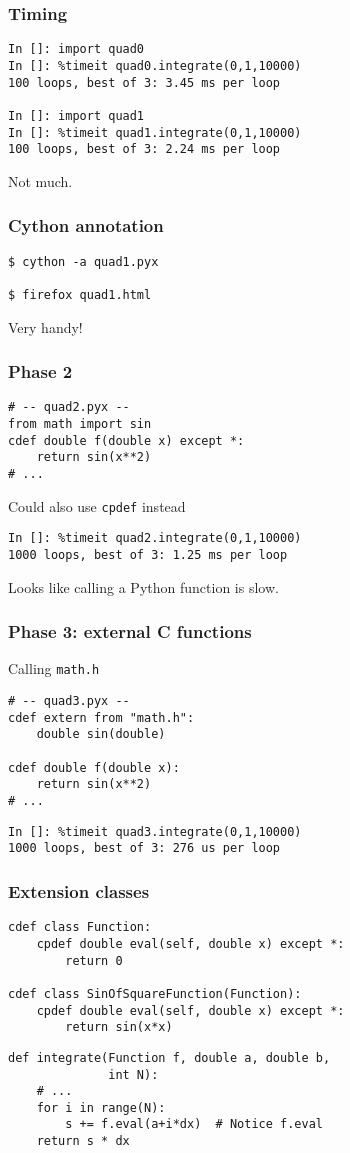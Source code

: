 \documentclass[14pt,compress]{beamer}
\newcounter{time}
\newcommand{\typ}[1]{\lstinline{#1}}
\begin{document}
\begin{frame}[fragile]
    \frametitle{Timing}
\begin{lstlisting}
In []: import quad0
In []: %timeit quad0.integrate(0,1,10000)
100 loops, best of 3: 3.45 ms per loop

In []: import quad1
In []: %timeit quad1.integrate(0,1,10000)
100 loops, best of 3: 2.24 ms per loop
\end{lstlisting}
Not much.
\end{frame}

\begin{frame}[fragile]
    \frametitle{Cython annotation}
\begin{lstlisting}
$ cython -a quad1.pyx

$ firefox quad1.html
\end{lstlisting}
Very handy!

\end{frame}


\begin{frame}[fragile]
    \frametitle{Phase 2}
\begin{lstlisting}
# -- quad2.pyx --
from math import sin
cdef double f(double x) except *:
    return sin(x**2)
# ...
\end{lstlisting}
Could also use \typ{cpdef} instead

\begin{lstlisting}
In []: %timeit quad2.integrate(0,1,10000)
1000 loops, best of 3: 1.25 ms per loop
\end{lstlisting}
Looks like calling a Python function is slow.

\end{frame}

\begin{frame}[fragile]
    \frametitle{Phase 3: external C functions}
    Calling \typ{math.h}
\begin{lstlisting}
# -- quad3.pyx --
cdef extern from "math.h":
    double sin(double)

cdef double f(double x):
    return sin(x**2)
# ...
\end{lstlisting}

\begin{lstlisting}
In []: %timeit quad3.integrate(0,1,10000)
1000 loops, best of 3: 276 us per loop
\end{lstlisting}
\end{frame}


\begin{frame}[fragile]
    \frametitle{Extension classes}
    \small
\begin{lstlisting}
cdef class Function:
    cpdef double eval(self, double x) except *:
        return 0

cdef class SinOfSquareFunction(Function):
    cpdef double eval(self, double x) except *:
        return sin(x*x)

\end{lstlisting}
\pause
\begin{lstlisting}
def integrate(Function f, double a, double b, 
              int N):
    # ...
    for i in range(N):
        s += f.eval(a+i*dx)  # Notice f.eval 
    return s * dx
\end{lstlisting}
\end{frame}
\end{document}

